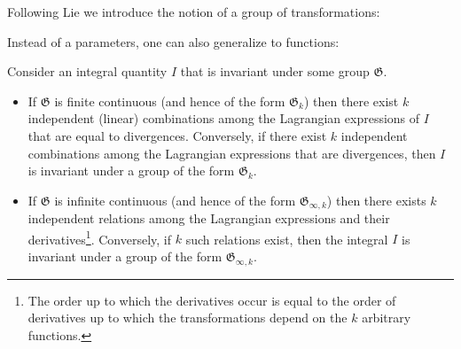     Following Lie we introduce the notion of a group of transformations:

    Instead of a parameters, one can also generalize to functions:

    \begin{theorem}[Noether]
        Consider an integral quantity $I$ that is invariant under some group $\mathfrak{G}$.
        \begin{itemize}
            \item If $\mathfrak{G}$ is finite continuous (and hence of the form $\mathfrak{G}_k$) then there exist $k$ independent (linear) combinations among the Lagrangian expressions of $I$ that are equal to divergences. Conversely, if there exist $k$ independent combinations among the Lagrangian expressions that are divergences, then $I$ is invariant under a group of the form $\mathfrak{G}_k$.
            \item If $\mathfrak{G}$ is infinite continuous (and hence of the form $\mathfrak{G}_{\infty,k}$) then there exists $k$ independent relations among the Lagrangian expressions and their derivatives\footnote{The order up to which the derivatives occur is equal to the order of derivatives up to which the transformations depend on the $k$ arbitrary functions.}. Conversely, if $k$ such relations exist, then the integral $I$ is invariant under a group of the form $\mathfrak{G}_{\infty,k}$.
        \end{itemize}
    \end{theorem}

